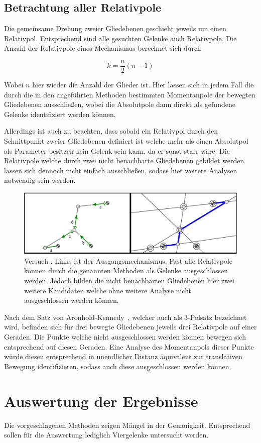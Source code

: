\subsection{Betrachtung aller Relativpole}

Die gemeinsame Drehung zweier Gliedebenen geschieht jeweils um einen Relativpol.
Entsprechend sind alle gesuchten Gelenke auch Relativpole.
Die Anzahl der Relativpole eines Mechanismus berechnet sich durch~\cite{Goessner2016}

\begin{equation}
    k = \frac{n}{2}(n-1)
    \label{eq:anzahl_pole}
\end{equation}

Wobei $n$ hier wieder die Anzahl der Glieder ist.
Hier lassen sich in jedem Fall die durch die in den angeführten Methoden bestimmten Momentanpole der bewegten Gliedebenen ausschlie{\ss}en, wobei die Absolutpole dann direkt als gefundene Gelenke identifiziert werden können.

Allerdings ist auch zu beachten, dass sobald ein Relativpol durch den Schnittpunkt zweier Gliedebenen definiert ist welche mehr als einen Absolutpol als Parameter besitzen kein Gelenk sein kann, da er sonst starr wäre.
Die Relativpole welche durch zwei nicht benachbarte Gliedebenen gebildet werden lassen sich dennoch nicht einfach ausschlie{\ss}en, sodass hier weitere Analysen notwendig sein werden.

\begin{figure}
    \includegraphics[width=\textwidth]{gfx/gruppe4_3_edit.png}
    \caption[Versuch ]{Versuch . Links ist der Ausgangsmechanismus. Fast alle Relativpole können durch die genannten Methoden als Gelenke ausgeschlossen werden. Jedoch bilden die nicht benachbarten Gliedebenen hier zwei weitere Kandidaten welche ohne weitere Analyse nicht ausgeschlossen werden können.}
    \label{fig:gruppe4_3}
\end{figure}

Nach dem Satz von Aronhold-Kennedy~\cite{Goessner2016, Kerle2016}, welcher auch als 3-Polsatz bezeichnet wird, befinden sich für drei bewegte Gliedebenen jeweils drei Relativpole auf einer Geraden.
Die Punkte welche nicht ausgeschlossen werden können bewegen sich entsprechend auf diesen Geraden.
Eine Analyse des Momentanpols dieser Punkte würde diesen entsprechend in unendlicher Distanz äquivalent zur translativen Bewegung identifizieren, sodass auch diese ausgeschlossen werden können.

\section{Auswertung der Ergebnisse}

Die vorgeschlagenen Methoden zeigen Mängel in der Genauigkeit.
Entsprechend sollen für die Auswertung lediglich Viergelenke untersucht werden.

